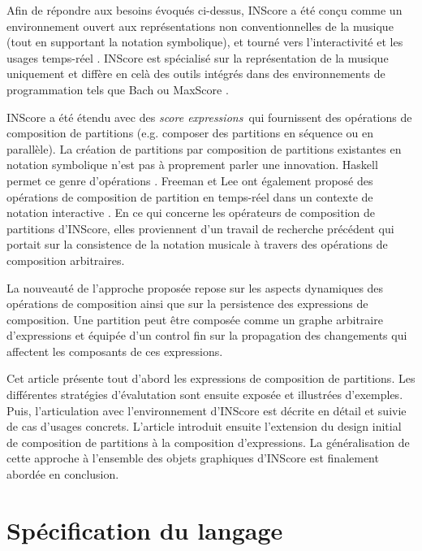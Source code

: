 \documentclass{article}
\newcommand{\sExprs}{\emph{score expressions}}
\begin{document}
Afin de répondre aux besoins évoqués ci-dessus, INScore \cite{Fober:12a,fober14c} a été conçu comme un environnement ouvert aux représentations non conventionnelles de la musique (tout en supportant la notation symbolique), et tourné vers l'interactivité et les usages temps-réel \cite{Fober:13b, Fober:14b}. INScore est spécialisé sur la représentation de la musique uniquement et diffère en celà des outils intégrés dans des environnements de programmation tels que Bach \cite{agostini12b} ou MaxScore \cite{didko08}. 

INScore a été étendu avec des \sExprs\ qui fournissent des opérations de composition de partitions (e.g. composer des partitions en séquence ou en parallèle). La création de partitions par composition de partitions existantes en notation symbolique n'est pas à proprement parler une innovation. Haskell permet ce genre d'opérations  \cite{Quick:2013:GAM:2505341.2505345}. Freeman et Lee ont également proposé des opérations de composition de partition en temps-réel dans un contexte de notation interactive \cite{Lee:2013}. En ce qui concerne les opérateurs de composition de partitions d'INScore, elles proviennent d'un travail de recherche précédent \cite{fober12b} qui portait sur la consistence de la notation musicale à travers des opérations de composition arbitraires.

La nouveauté de l'approche proposée repose sur les aspects dynamiques des opérations de composition ainsi que sur la persistence des expressions de composition. Une partition peut être composée comme un graphe arbitraire d'expressions et équipée d'un control fin sur la propagation des changements qui affectent les composants de ces expressions.

Cet article présente tout d'abord les expressions de composition de partitions. Les différentes stratégies d'évalutation sont ensuite exposée et illustrées d'exemples. Puis, l'articulation avec l'environnement d'INScore est décrite en détail et suivie de cas d'usages concrets. L'article introduit ensuite l'extension du design initial de composition de partitions à la composition d'expressions. La généralisation de cette approche à l'ensemble des objets graphiques d'INScore est finalement abordée en conclusion.


\section{Spécification du langage}\label{language}
\end{document}
